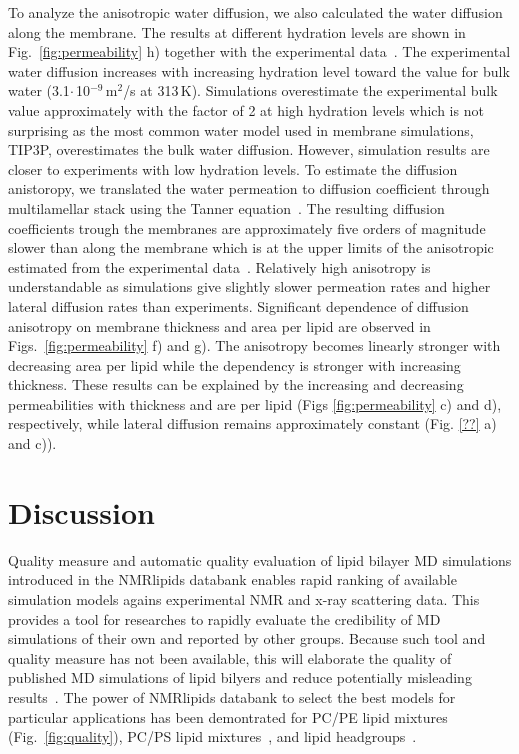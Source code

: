 \documentclass[fleqn,10pt]{wlscirep}
\begin{document}
To analyze the anisotropic water diffusion, we also calculated the water diffusion along the membrane. The results at different hydration levels are shown in Fig.~\ref{fig:permeability} h) together with the experimental data~\cite{rudakova04}. The experimental water diffusion increases with increasing hydration level toward the value for bulk water (3.1$\cdot$\,10$^{-9}$\,m$^2$/s at 313\,K)\cite{khakimov08}. Simulations overestimate the experimental bulk value approximately with the factor of 2 at high hydration levels which is not surprising as the most common water model used in membrane simulations, TIP3P, overestimates the bulk water diffusion. However, simulation results are closer to experiments with low hydration levels. To estimate the diffusion anistoropy, we translated the water permeation to diffusion coefficient through multilamellar stack using the Tanner equation~\cite{??}. The resulting diffusion coefficients trough the membranes are approximately five orders of magnitude slower than along the membrane which is at the upper limits of the anisotropic estimated from the experimental data~\cite{nitsche19}. Relatively high anisotropy is understandable as simulations give slightly slower permeation rates and higher lateral diffusion rates than experiments. Significant dependence of diffusion anisotropy on membrane thickness and area per lipid are observed in Figs.~\ref{fig:permeability} f) and g). The anisotropy becomes linearly stronger with decreasing area per lipid while the dependency is stronger with increasing thickness. These results can be explained by the increasing and decreasing permeabilities with thickness and are per lipid (Figs \ref{fig:permeability} c) and d), respectively, while lateral diffusion remains approximately constant (Fig. \ref{??} a) and c)). 

\section{Discussion}


Quality measure and automatic quality evaluation of lipid bilayer MD simulations introduced in the NMRlipids databank enables rapid ranking of available simulation models agains experimental NMR and x-ray scattering data. This provides a tool for researches to rapidly evaluate the credibility of MD simulations of their own and reported by other groups. Because such tool and quality measure has not been available, this will elaborate the quality of published MD simulations of lipid bilyers and reduce potentially misleading results~\cite{antila22b}. The power of NMRlipids databank to select the best models for particular applications has been demontrated for PC/PE lipid mixtures (Fig.~\ref{fig:quality}), PC/PS lipid mixtures~\cite{antila22b}, and lipid headgroups~\cite{bacle21}.
\end{document}
